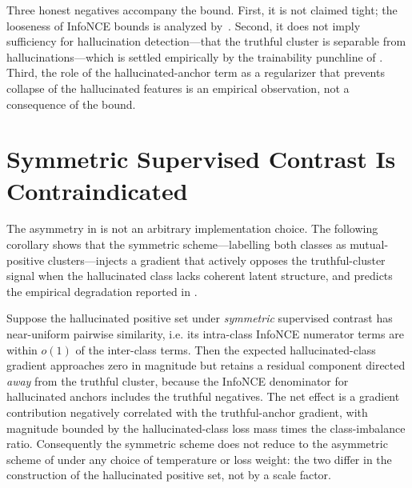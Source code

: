 \begin{remark}
Three honest negatives accompany the bound. First, it is not claimed tight; the
looseness of InfoNCE bounds is analyzed by~\citet{poole2019variational}. Second,
it does not imply sufficiency for hallucination detection---that the truthful
cluster is separable from hallucinations---which is settled empirically by the
trainability punchline of . Third, the role of the
hallucinated-anchor term as a regularizer that prevents collapse of the
hallucinated features is an empirical observation, not a consequence of the
bound.
\end{remark}

\section{Symmetric Supervised Contrast Is Contraindicated}
\label{sec:hd-proofs:symcon}

The asymmetry in  is not an arbitrary implementation
choice. The following corollary shows that the symmetric scheme---labelling both
classes as mutual-positive clusters---injects a gradient that actively opposes
the truthful-cluster signal when the hallucinated class lacks coherent latent
structure, and predicts the empirical degradation reported in
.

\begin{corollary}\label{cor:hd:symcon}
Suppose the hallucinated positive set under \emph{symmetric} supervised contrast
has near-uniform pairwise similarity, i.e. its intra-class InfoNCE numerator
terms are within $o(1)$ of the inter-class terms. Then the expected
hallucinated-class gradient approaches zero in magnitude but retains a residual
component directed \emph{away} from the truthful cluster, because the InfoNCE
denominator for hallucinated anchors includes the truthful negatives. The net
effect is a gradient contribution negatively correlated with the truthful-anchor
gradient, with magnitude bounded by the hallucinated-class loss mass times the
class-imbalance ratio. Consequently the symmetric scheme does not reduce to the
asymmetric scheme of  under any choice of temperature or
loss weight: the two differ in the construction of the hallucinated positive set,
not by a scale factor.
\end{corollary}

